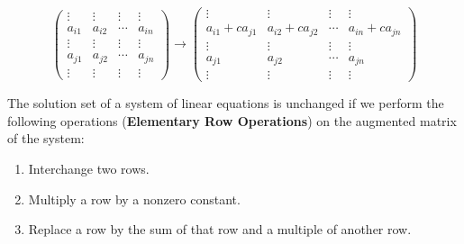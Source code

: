 \documentclass[10pt, a4paper]{article}
\begin{document}
\begin{enumerate}
\[    \begin{pmatrix}
        \vdots & \vdots & \vdots & \vdots \\
        a_{i1} & a_{i2} & \cdots & a_{in} \\
        \vdots & \vdots & \vdots & \vdots \\
        a_{j1} & a_{j2} & \cdots & a_{jn} \\
        \vdots & \vdots & \vdots & \vdots
    \end{pmatrix}
    \rightarrow
    \begin{pmatrix}
        \vdots & \vdots & \vdots & \vdots \\
        a_{i1} + c a_{j1} & a_{i2} + c a_{j2} & \cdots & a_{in} + c a_{jn} \\
        \vdots & \vdots & \vdots & \vdots \\
        a_{j1} & a_{j2} & \cdots & a_{jn} \\
        \vdots & \vdots & \vdots & \vdots
    \end{pmatrix}
    \]
\end{enumerate}
\begin{proposition}
    The solution set of a system of linear equations is unchanged if we perform the following operations (\textbf{Elementary Row Operations}) on the augmented matrix of the system:
    \begin{enumerate}
        \item Interchange two rows.
        \item Multiply a row by a nonzero constant.
        \item Replace a row by the sum of that row and a multiple of another row.
    \end{enumerate}
\end{proposition}
\end{document}
